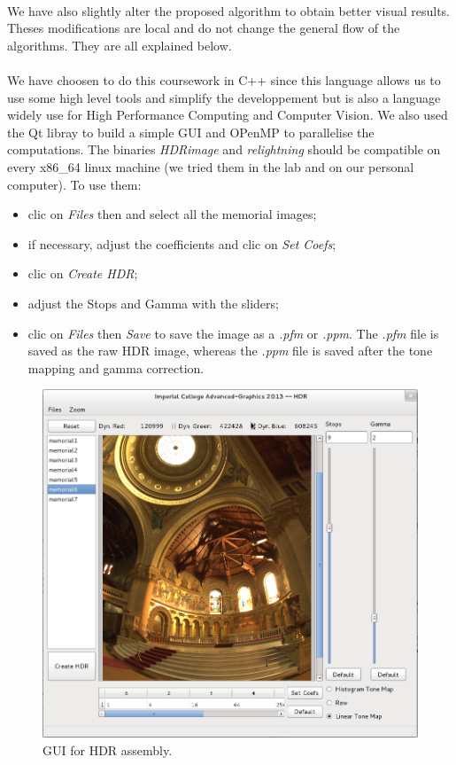 \documentclass[a4paper,12pt,oneside,final]{report}
\begin{document}
\paragraph{}
We have also slightly alter the proposed algorithm to obtain better visual results. Theses modifications are local and do not change the general flow of the algorithms. They are all explained below.
\paragraph{}
We have choosen to do this coursework in C++ since this language allows us to use some high level tools and simplify the developpement but is also a language widely use for High Performance Computing and Computer Vision. We also used the Qt libray to build a simple GUI and OPenMP to parallelise the computations. The binaries \textit{HDRimage} and \textit{relightning} should be compatible on every x86\_64 linux machine (we tried them in the lab and on our personal computer). To use them:
\begin{itemize}
\item clic on \textit{Files} then  and select all the memorial images;
\item if necessary, adjust the coefficients and clic on \textit{Set Coefs};
\item clic on \textit{Create HDR};
\item adjust the Stops and Gamma with the sliders;
\item clic on \textit{Files} then \textit{Save} to save the image as a \textit{.pfm} or \textit{.ppm}. The \textit{.pfm} file is saved as the raw HDR image, whereas the \textit{.ppm} file is saved after the tone mapping and gamma correction.
\end{itemize}

\begin{figure}[!h]
\centering
\includegraphics[height=\textheight/2]{pictures/gui.png}
\caption{GUI for HDR assembly.}
\end{figure}
\end{document}
